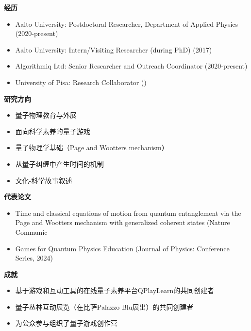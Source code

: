 \par{\footnotesize\color{mainred}\textbf{经历}}
\begin{itemize}[leftmargin=1.2em,itemsep=0pt,topsep=0pt]
\item {\footnotesize Aalto University: Postdoctoral Researcher, Department of Applied Physics (2020-present)}
\item {\footnotesize Aalto University: Intern/Visiting Researcher (during PhD) (2017)}
\item {\footnotesize Algorithmiq Ltd: Senior Researcher and Outreach Coordinator (2020-present)}
\item {\footnotesize University of Pisa: Research Collaborator ()}
\end{itemize}
\par{\footnotesize\color{mainred}\textbf{研究方向}}
\begin{itemize}[leftmargin=1.2em,itemsep=0pt,topsep=0pt]
\item {\footnotesize 量子物理教育与外展}
\item {\footnotesize 面向科学素养的量子游戏}
\item {\footnotesize 量子物理学基础（Page and Wootters mechanism）}
\item {\footnotesize 从量子纠缠中产生时间的机制}
\item {\footnotesize 文化-科学故事叙述}
\end{itemize}
\par{\footnotesize\color{mainred}\textbf{代表论文}}
\begin{itemize}[leftmargin=1.2em,itemsep=0pt,topsep=0pt]
\item {\footnotesize Time and classical equations of motion from quantum entanglement via the Page and Wootters mechanism with generalized coherent states (Nature Communic}
\item {\footnotesize Games for Quantum Physics Education (Journal of Physics: Conference Series, 2024)}
\end{itemize}
\par{\footnotesize\color{mainred}\textbf{成就}}
\begin{itemize}[leftmargin=1.2em,itemsep=0pt,topsep=0pt]
\item {\footnotesize 基于游戏和互动工具的在线量子素养平台QPlayLearn的共同创建者}
\item {\footnotesize 量子丛林互动展览（在比萨Palazzo Blu展出）的共同创建者}
\item {\footnotesize 为公众参与组织了量子游戏创作营}
\end{itemize}
